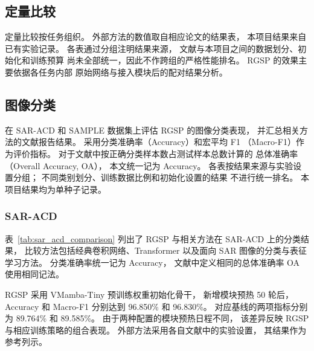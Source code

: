\documentclass[journal]{IEEEtran}
\begin{document}
\subsection{定量比较}
\label{sec:quantitative_comparison}

定量比较按任务组织。
外部方法的数值取自相应论文的结果表，
本项目结果来自已有实验记录。
各表通过分组注明结果来源，
文献与本项目之间的数据划分、初始化和训练预算
尚未全部统一，因此不作跨组的严格性能排名。
RGSP 的效果主要依据各任务内部
原始网络与接入模块后的配对结果分析。

\subsection{图像分类}
\label{sec:classification_results}

在 SAR-ACD 和 SAMPLE 数据集上评估 RGSP 的图像分类表现，
并汇总相关方法的文献报告结果。
采用分类准确率（Accuracy）和宏平均 F1
（Macro-F1）作为评价指标。
对于文献中按正确分类样本数占测试样本总数计算的
总体准确率（Overall Accuracy, OA），
本文统一记为 Accuracy。
各表按结果来源与实验设置分组；
不同类别划分、训练数据比例和初始化设置的结果
不进行统一排名。
本项目结果均为单种子记录。

\subsubsection{SAR-ACD}
\label{sec:sar_acd_results}

表~\ref{tab:sar_acd_comparison}
列出了 RGSP 与相关方法在 SAR-ACD 上的分类结果，
比较方法包括经典卷积网络、Transformer
以及面向 SAR 图像的分类与表征学习方法。
分类准确率统一记为 Accuracy，
文献中定义相同的总体准确率 OA 使用相同记法。

RGSP 采用 VMamba-Tiny 预训练权重初始化骨干，
新增模块预热 50 轮后，
Accuracy 和 Macro-F1 分别达到
96.850\% 和 96.830\%。
对应基线的两项指标分别为
89.764\% 和 89.585\%。
由于两种配置的模块预热日程不同，
该差异反映 RGSP 与相应训练策略的组合表现。
外部方法采用各自文献中的实验设置，
其结果作为参考列示。
\end{document}
